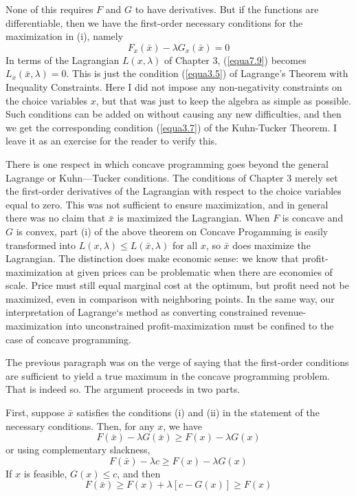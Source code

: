 None of this requires $F$ and $G$ to have derivatives. But if the functions are differentiable, then we have the first-order necessary conditions for the maximization in (i), namely
\begin{equation} \label{equa7.9}
F_x(\bar{x}) - \lambda G_x(\bar{x}) =0
\end{equation}
In terms of the Lagrangian $L(x,\lambda)$ of Chapter 3, (\ref{equa7.9}) becomes $L_x(\bar{x}, \lambda) =0$. This is just the condition (\ref{equa3.5}) of Lagrange's Theorem with Inequality Constraints. Here I did not impose any non-negativity constraints on the choice variables $x$, but that was just to keep the algebra as simple as possible. Such conditions can be added on without causing any new difficulties, and then we get the corresponding condition (\ref{equa3.7}) of the Kuhn-Tucker Theorem. I leave it as an exercise for the reader to verify this.

There is one respect in which concave programming goes beyond the general Lagrange or Kuhn—Tucker conditions. The conditions of Chapter 3 merely set the first-order derivatives of the Lagrangian with respect to the choice variables equal to zero. This was not sufficient to ensure maximization, and in general there was no claim that $\bar{x}$ is maximized the Lagrangian. When $F$ is concave and $G$ is convex, part (i) of the above theorem on Concave Progamming is easily transformed into $L(x, \lambda) \leq L(\bar{x}, \lambda)$ for all $x$, so $\bar{x}$ does maximize the Lagrangian. The distinction does make economic sense: we know that profit-maximization at given prices can be problematic when there are economies of scale. Price must still equal marginal cost at the optimum, but profit need not be maximized, even in comparison with neighboring points. In the same way, our interpretation of Lagrange‘s method as converting constrained revenue-maximization into unconstrained profit-maximization must be confined to the case of concave programming.

The previous paragraph was on the verge of saying that the first-order conditions are sufficient to yield a true maximum in the concave programming problem. That is indeed so. The argument proceeds in two parts.

First, suppose $\bar{x}$ satisfies the conditions (i) and (ii) in the statement of the necessary conditions. Then, for any $x$, we have
\begin{equation*}
F(\bar{x}) - \lambda G(\bar{x}) \geq F(x) - \lambda G(x)
\end{equation*}
or using complementary slackness, 
\begin{equation*}
F(\bar{x}) - \lambda c \geq F(x) - \lambda G(x)
\end{equation*}
If $x$ is feasible, $G(x) \leq c$, and then
\begin{equation*}
F(\bar{x}) \geq  F(x) + \lambda [c - G(x)]  \geq F(x) 
\end{equation*}

